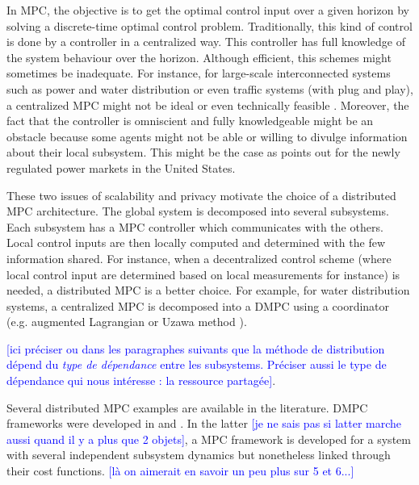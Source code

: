 \documentclass[conference]{IEEEtran}
\newcommand{\rem}[1]{\textcolor{blue}{[#1]}}
\begin{document}
In MPC, the objective is to get the optimal control input over a given horizon by solving a discrete-time optimal control problem. Traditionally, this kind of control is done by a controller in a centralized way.  This controller has full knowledge of the system behaviour over the horizon. Although efficient, this schemes might sometimes be inadequate. For instance,  for large-scale interconnected systems such as power and water distribution or even traffic systems (with plug and play), a centralized MPC might not be ideal or even technically feasible \cite{Jia}. Moreover, the fact that the controller is omniscient and  fully knowledgeable might be an obstacle because some agents might not be able or willing to divulge information about their local subsystem. This might be the case as \cite{Campo} points out for the newly regulated power markets in the United States.

These two issues of scalability and privacy motivate the choice of a distributed MPC architecture. The global system is decomposed into several subsystems. Each subsystem has a MPC controller which communicates with the others. Local control inputs are then locally computed and determined with the few information shared. For instance, when a decentralized control scheme (where local control input are determined based on local measurements for instance) is needed, a distributed MPC is a better choice. For example, for water distribution systems, a centralized MPC is decomposed into a DMPC using a coordinator (e.g. augmented Lagrangian \cite{Campo} or Uzawa method \cite{Cohen}).

\rem{ici préciser ou dans les paragraphes suivants que la méthode de distribution dépend du \emph{type de dépendance} entre les subsystems.
Préciser aussi le type de dépendance qui nous intéresse : la ressource partagée}.

Several distributed MPC examples are available in the literature. DMPC frameworks were developed in \cite{Acar, Sawa} and \cite{ Dunbar}. In the latter \rem{je ne sais pas si latter marche aussi quand il y a plus que 2 objets}, a MPC framework is developed for a system with several independent subsystem dynamics but nonetheless linked through their cost functions. \rem{là on aimerait en savoir un peu plus sur 5 et 6...}
\end{document}
